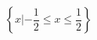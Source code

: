 \documentclass{ltjsarticle}
\begin{document}
\[ \left\{ x | -\frac{1}{2} \leq x \leq \frac{1}{2} \right\} \]
\end{document}
